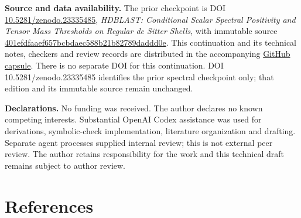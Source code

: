 \documentclass[
  11pt,
]{article}
\begin{document}
\textbf{Source and data availability.} The prior checkpoint is DOI
\href{https://doi.org/10.5281/zenodo.23335485}{10.5281/zenodo.23335485},
\emph{HDBLAST: Conditional Scalar Spectral Positivity and Tensor Mass
Thresholds on Regular de Sitter Shells}, with immutable source
\href{https://github.com/maldonado-research/HDblast/tree/401efdfaaef657bcbdaec588b21b82789daddd0e/research/HDBLAST_REGULAR_SHELL_SPECTRA_20261013}{401efdfaaef657bcbdaec588b21b82789daddd0e}.
This continuation and its technical notes, checkers and review records
are distributed in the accompanying
\href{https://github.com/maldonado-research/HDblast/tree/main/research/HDBLAST_CONE_PHASE_SPACE_20261013}{GitHub
capsule}. There is no separate DOI for this continuation. DOI
10.5281/zenodo.23335485 identifies the prior spectral checkpoint only;
that edition and its immutable source remain unchanged.

\textbf{Declarations.} No funding was received. The author declares no
known competing interests. Substantial OpenAI Codex assistance was used
for derivations, symbolic-check implementation, literature organization
and drafting. Separate agent processes supplied internal review; this is
not external peer review. The author retains responsibility for the work
and this technical draft remains subject to author review.

\section{References}\label{references}
\end{document}
